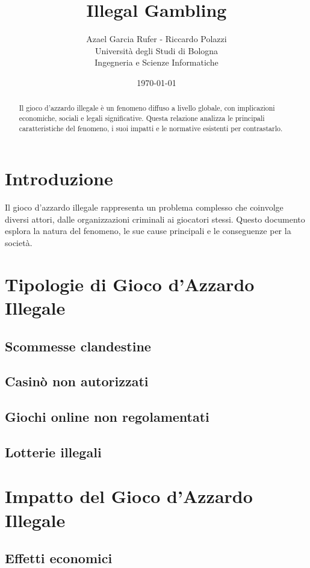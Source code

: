 \documentclass[a4paper,12pt]{article}
\title{\textbf{Illegal Gambling}}
\author{Azael Garcia Rufer - Riccardo Polazzi \\ Università degli Studi di Bologna \\ Ingegneria e Scienze Informatiche}
\date{\today}
\begin{document}
\maketitle

\begin{abstract}
Il gioco d'azzardo illegale è un fenomeno diffuso a livello globale, con implicazioni economiche, sociali e legali significative. Questa relazione analizza le principali caratteristiche del fenomeno, i suoi impatti e le normative esistenti per contrastarlo.
\end{abstract}

\newpage
\tableofcontents
\newpage

\section{Introduzione}
Il gioco d'azzardo illegale rappresenta un problema complesso che coinvolge diversi attori, dalle organizzazioni criminali ai giocatori stessi. Questo documento esplora la natura del fenomeno, le sue cause principali e le conseguenze per la società.

\section{Tipologie di Gioco d'Azzardo Illegale}
\subsection{Scommesse clandestine}
\subsection{Casinò non autorizzati}
\subsection{Giochi online non regolamentati}
\subsection{Lotterie illegali}

\section{Impatto del Gioco d'Azzardo Illegale}
\subsection{Effetti economici}
\end{document}
